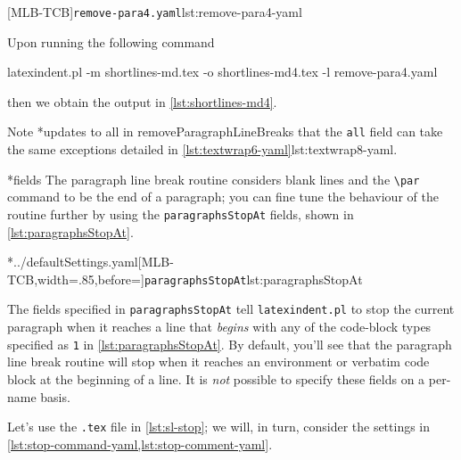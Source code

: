 	\begin{minipage}{.45\linewidth}
	\end{minipage}
	\hfill
	\begin{minipage}{.49\linewidth}
		[MLB-TCB]{\texttt{remove-para4.yaml}}{lst:remove-para4-yaml}
	\end{minipage}

	Upon running the following command
	\begin{widepage}
		\begin{commandshell}
latexindent.pl -m shortlines-md.tex -o shortlines-md4.tex -l remove-para4.yaml
\end{commandshell}
	\end{widepage}
	then we obtain the output in \cref{lst:shortlines-md4}. 

	Note%
	*{updates to all in removeParagraphLineBreaks} that the
	\texttt{all} field can take the same exceptions detailed in
	\cref{lst:textwrap6-yaml}{lst:textwrap8-yaml}.

*{fields}
	The paragraph line break routine considers blank lines and the
	\lstinline|\par| command to be the end of a paragraph;
	 you can fine tune the behaviour of the routine further by
	using the \texttt{paragraphsStopAt} fields, shown in \cref{lst:paragraphsStopAt}.

	\cmhlistingsfromfile[style=paragraphsStopAt]*{../defaultSettings.yaml}[MLB-TCB,width=.85\linewidth,before=\centering]{\texttt{paragraphsStopAt}}{lst:paragraphsStopAt}

	The fields specified in \texttt{paragraphsStopAt} tell \texttt{latexindent.pl} to
	stop the current paragraph when it reaches a line that \emph{begins} with
	any of the code-block types specified as \texttt{1} in
	\cref{lst:paragraphsStopAt}. By default, you'll see that the paragraph line break routine
	will stop when it reaches an environment or verbatim code block at the beginning of a
	line. It is \emph{not} possible to specify these fields on a per-name
	basis.

	Let's use the \texttt{.tex} file in \cref{lst:sl-stop}; we will,
	in turn, consider the settings in \cref{lst:stop-command-yaml,lst:stop-comment-yaml}.

